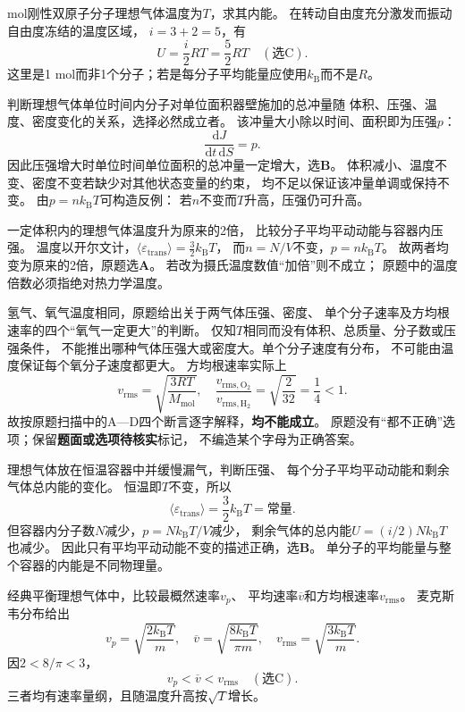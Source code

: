  mol刚性双原子分子理想气体温度为$T$，求其内能。
\workings
在转动自由度充分激发而振动自由度冻结的温度区域，
$i=3+2=5$，有
\[
\boxed{U=\frac{i}{2}RT=\frac52RT}\quad(\text{选C}).
\]
\crosscheck 这里是1 mol而非1个分子；若是每分子平均能量应使用$k_{\mathrm B}$而不是$R$。

\problemtext 判断理想气体单位时间内分子对单位面积器壁施加的总冲量随
体积、压强、温度、密度变化的关系，选择必然成立者。
\workings
该冲量大小除以时间、面积即为压强$p$：
\[
\boxed{\frac{\mathrm dJ}{\mathrm dt\,\mathrm dS}=p}.
\]
因此压强增大时单位时间单位面积的总冲量一定增大，选\textbf{B}。
体积减小、温度不变、密度不变若缺少对其他状态变量的约束，
均不足以保证该冲量单调或保持不变。
\crosscheck 由$p=nk_{\mathrm B}T$可构造反例：
若$n$不变而$T$升高，压强仍可升高。

\problemtext 一定体积内的理想气体温度升为原来的2倍，
比较分子平均平动动能与容器内压强。
\workings
温度以开尔文计，$\langle\varepsilon_{\mathrm{trans}}\rangle=\tfrac32 k_{\mathrm B}T$，
而$n=N/V$不变，$p=nk_{\mathrm B}T$。
故两者均变为原来的2倍，原题选\textbf{A}。
\crosscheck 若改为摄氏温度数值“加倍”则不成立；
原题中的温度倍数必须指绝对热力学温度。

\problemtext 氢气、氧气温度相同，原题给出关于两气体压强、密度、
单个分子速率及方均根速率的四个“氧气一定更大”的判断。
\workings
仅知$T$相同而没有体积、总质量、分子数或压强条件，
不能推出哪种气体压强大或密度大。单个分子速度有分布，
不可能由温度保证每个氧分子速度都更大。
方均根速率实际上
\[
v_{\mathrm{rms}}=\sqrt{\frac{3RT}{M_{\mathrm{mol}}}},
\quad
\frac{v_{\mathrm{rms,O_2}}}{v_{\mathrm{rms,H_2}}}
=\sqrt{\frac{2}{32}}=\frac14<1.
\]
故按原题扫描中的A—D四个断言逐字解释，\textbf{均不能成立}。
\crosscheck 原题没有“都不正确”选项；保留\textbf{题面或选项待核实}标记，
不编造某个字母为正确答案。

\problemtext 理想气体放在恒温容器中并缓慢漏气，判断压强、
每个分子平均平动动能和剩余气体总内能的变化。
\workings
恒温即$T$不变，所以
\[
\boxed{\langle\varepsilon_{\mathrm{trans}}\rangle
=\frac32k_{\mathrm B}T=\text{常量}}.
\]
但容器内分子数$N$减少，$p=Nk_{\mathrm B}T/V$减少，
剩余气体的总内能$U=(i/2)Nk_{\mathrm B}T$也减少。
因此只有平均平动动能不变的描述正确，选\textbf{B}。
\crosscheck 单分子的平均能量与整个容器的内能是不同物理量。

\problemtext 经典平衡理想气体中，比较最概然速率$v_p$、
平均速率$\overline v$和方均根速率$v_{\mathrm{rms}}$。
\workings
麦克斯韦分布给出
\[
v_p=\sqrt{\frac{2k_{\mathrm B}T}{m}},\quad
\overline v=\sqrt{\frac{8k_{\mathrm B}T}{\pi m}},\quad
v_{\mathrm{rms}}=\sqrt{\frac{3k_{\mathrm B}T}{m}}.
\]
因$2<8/\pi<3$，
\[
\boxed{v_p<\overline v<v_{\mathrm{rms}}}\quad(\text{选C}).
\]
\crosscheck 三者均有速率量纲，且随温度升高按$\sqrt T$增长。

